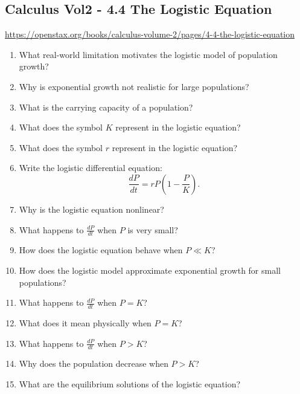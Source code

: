 \subsection{Calculus Vol2 - 4.4 The Logistic Equation}

\url{https://openstax.org/books/calculus-volume-2/pages/4-4-the-logistic-equation}

\begin{enumerate}

\item What real-world limitation motivates the logistic model of population growth?

\item Why is exponential growth not realistic for large populations?

\item What is the carrying capacity of a population?

\item What does the symbol $K$ represent in the logistic equation?

\item What does the symbol $r$ represent in the logistic equation?

\item Write the logistic differential equation:
  \[
    \frac{dP}{dt} = rP\left(1 - \frac{P}{K}\right).
  \]

\item Why is the logistic equation nonlinear?

\item What happens to $\frac{dP}{dt}$ when $P$ is very small?

\item How does the logistic equation behave when $P \ll K$?

\item How does the logistic model approximate exponential growth for small populations?

\item What happens to $\frac{dP}{dt}$ when $P = K$?

\item What does it mean physically when $P = K$?

\item What happens to $\frac{dP}{dt}$ when $P > K$?

\item Why does the population decrease when $P > K$?

\item What are the equilibrium solutions of the logistic equation?


\end{enumerate}

